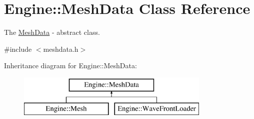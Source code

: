 \hypertarget{classEngine_1_1MeshData}{}\section{Engine\+:\+:Mesh\+Data Class Reference}
\label{classEngine_1_1MeshData}


The \hyperlink{classEngine_1_1MeshData}{Mesh\+Data} -\/ abstract class.  




{\ttfamily \#include $<$meshdata.\+h$>$}

Inheritance diagram for Engine\+:\+:Mesh\+Data\+:\begin{figure}[H]
\begin{center}
\leavevmode
\includegraphics[height=2.000000cm]{classEngine_1_1MeshData}
\end{center}
\end{figure}
